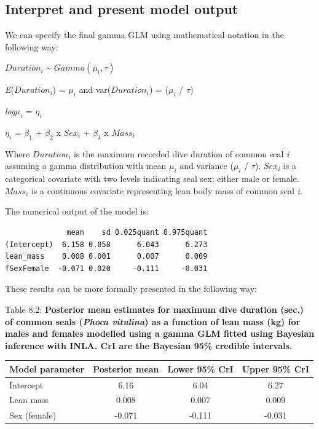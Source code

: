 \documentclass[
]{book}
\begin{document}
\hypertarget{gamma-present}{%
\subsection{Interpret and present model output}\label{gamma-present}}

We can specify the final gamma GLM using mathematical notation in the following way:

\(Duration_{i}\) \textasciitilde{} \(Gamma(\mu_{i}, \tau)\)

\emph{E}(\(Duration_{i}\)) = \(\mu_i\) and var(\(Duration_{i}\)) = (\(\mu_i\) / \(\tau\))

\emph{log}\(\mu_i\) = \(\eta_i\)

\(\eta_i\) = \(\beta_1\) + \(\beta_2\) x \(Sex_{i}\) + \(\beta_3\) x \(Mass_{i}\)

Where \(Duration_{i}\) is the maximum recorded dive duration of common seal \emph{i} assuming a gamma distribution with mean \(\mu_i\) and variance (\(\mu_i\) / \(\tau\)). \(Sex_{i}\) is a categorical covariate with two levels indicating seal sex; either male or female. \(Mass_{i}\) is a continuous covariate representing lean body mass of common seal \emph{i}.

The numerical output of the model is:

\begin{verbatim}
              mean    sd 0.025quant 0.975quant
(Intercept)  6.158 0.058      6.043      6.273
lean_mass    0.008 0.001      0.007      0.009
fSexFemale  -0.071 0.020     -0.111     -0.031
\end{verbatim}

These results can be more formally presented in the following way:

Table 8.2: \textbf{Posterior mean estimates for maximum dive duration (sec.) of common seals (\emph{Phoca vitulina}) as a function of lean mass (kg) for males and females modelled using a gamma GLM fitted using Bayesian inference with INLA. CrI are the Bayesian 95\% credible intervals.}

\begin{longtable}[]{@{}lccc@{}}
\toprule
Model parameter & Posterior mean & Lower 95\% CrI & Upper 95\% CrI \\
\midrule
\endhead
Intercept & 6.16 & 6.04 & 6.27 \\
Lean mass & 0.008 & 0.007 & 0.009 \\
Sex (female) & -0.071 & -0.111 & -0.031 \\
\bottomrule
\end{longtable}
\end{document}
